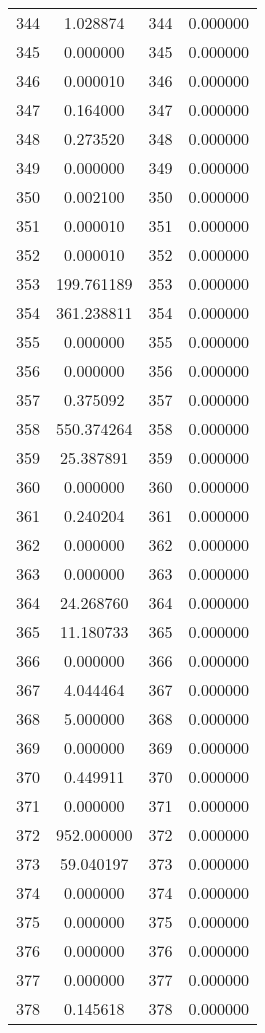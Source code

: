 \documentclass[12pt]{article}
\begin{document}
\begin{longtable}{@{}cccc@{}}
344 & 1.028874 & 344 & 0.000000 \\
345 & 0.000000 & 345 & 0.000000 \\
346 & 0.000010 & 346 & 0.000000 \\
347 & 0.164000 & 347 & 0.000000 \\
348 & 0.273520 & 348 & 0.000000 \\
349 & 0.000000 & 349 & 0.000000 \\
350 & 0.002100 & 350 & 0.000000 \\
351 & 0.000010 & 351 & 0.000000 \\
352 & 0.000010 & 352 & 0.000000 \\
353 & 199.761189 & 353 & 0.000000 \\
354 & 361.238811 & 354 & 0.000000 \\
355 & 0.000000 & 355 & 0.000000 \\
356 & 0.000000 & 356 & 0.000000 \\
357 & 0.375092 & 357 & 0.000000 \\
358 & 550.374264 & 358 & 0.000000 \\
359 & 25.387891 & 359 & 0.000000 \\
360 & 0.000000 & 360 & 0.000000 \\
361 & 0.240204 & 361 & 0.000000 \\
362 & 0.000000 & 362 & 0.000000 \\
363 & 0.000000 & 363 & 0.000000 \\
364 & 24.268760 & 364 & 0.000000 \\
365 & 11.180733 & 365 & 0.000000 \\
366 & 0.000000 & 366 & 0.000000 \\
367 & 4.044464 & 367 & 0.000000 \\
368 & 5.000000 & 368 & 0.000000 \\
369 & 0.000000 & 369 & 0.000000 \\
370 & 0.449911 & 370 & 0.000000 \\
371 & 0.000000 & 371 & 0.000000 \\
372 & 952.000000 & 372 & 0.000000 \\
373 & 59.040197 & 373 & 0.000000 \\
374 & 0.000000 & 374 & 0.000000 \\
375 & 0.000000 & 375 & 0.000000 \\
376 & 0.000000 & 376 & 0.000000 \\
377 & 0.000000 & 377 & 0.000000 \\
378 & 0.145618 & 378 & 0.000000 \\

\end{longtable}
\end{document}
